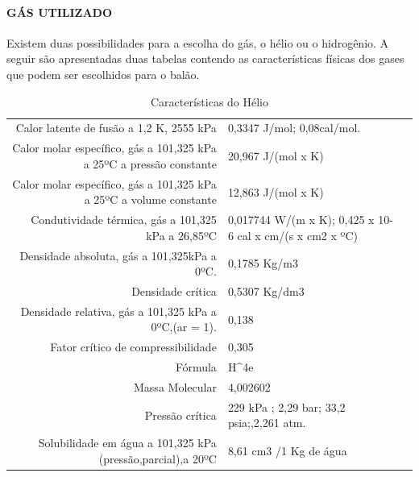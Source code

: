     \paragraph{GÁS UTILIZADO}
    Existem duas possibilidades para a escolha do gás, o hélio ou o hidrogênio. A seguir são apresentadas duas tabelas contendo as características físicas dos gases que podem ser escolhidos para o balão.
    
\begin{table}[h]
\caption{Características do Hélio}
\vspace{0.5cm}
\begin{tabular}{|r||lr}
\hline

Calor latente de fusão a 1,2 K, 2555 kPa & 0,3347 J/mol; 0,08cal/mol.\\
Calor molar específico, gás a 101,325 kPa a 25ºC a pressão constante & 20,967 J/(mol x K) \\ 
Calor molar específico, gás a 101,325 kPa a 25ºC a volume constante  & 12,863 J/(mol x K)                                       \\
Condutividade térmica, gás a 101,325 kPa a 26,85ºC                   & 0,017744 W/(m x K); 0,425 x 10-6 cal x cm/(s x cm2 x ºC) \\
Densidade absoluta, gás a 101,325kPa a 0ºC.                          & 0,1785 Kg/m3                                             \\
Densidade crítica                                                    & 0,5307 Kg/dm3                                            \\
Densidade relativa, gás a 101,325 kPa a 0ºC,(ar = 1).                & 0,138                                                    \\
Fator crítico de compressibilidade                                   & 0,305                                                    \\
Fórmula                                                              & H^4e                                                      \\
Massa Molecular                                                      & 4,002602                                                 \\
Pressão crítica                                                      & 229 kPa ; 2,29 bar; 33,2 psia;,2,261 atm.                \\
Solubilidade em água a 101,325 kPa (pressão,parcial),a 20ºC          & 8,61 cm3 /1 Kg de água                                   \\

\end{tabular}
\end{table}
